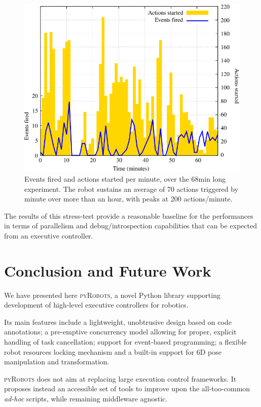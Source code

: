 \documentclass[a4paper, 10pt, conference]{ieeeconf}      %
\newcommand{\pyRobots}{\textsc{pyRobots}}
\begin{document}
\begin{figure}
    \centering
    \includegraphics[width=0.9\columnwidth]{croquignole-expe}
    \caption{Events fired and actions started per minute, over the 68min long
    experiment. The robot sustains an average of 70 actions triggered by minute over
    more than an hour, with peaks at 200 actions/minute.}
    \label{croq_actions}
\end{figure}

The results of this stress-test provide a reasonable baseline for the
performances in terms of parallelism and debug/introspection capabilities that
can be expected from an executive controller.

\section{Conclusion and Future Work}


We have presented here \pyRobots{}, a novel Python library supporting
development of high-level executive controllers for robotics.

Its main features include a lightweight, unobtrusive design based on code
annotations; a pre-emptive concurrency model allowing for proper, explicit
handling of task cancellation; support for event-based programming; a flexible
robot resources locking mechanism and a built-in support for 6D pose
manipulation and transformation.

\pyRobots{} does not aim at replacing large execution control frameworks. It
proposes instead an accessible set of tools to improve upon the all-too-common
\emph{ad-hoc} scripts, while remaining middleware agnostic.
\end{document}
